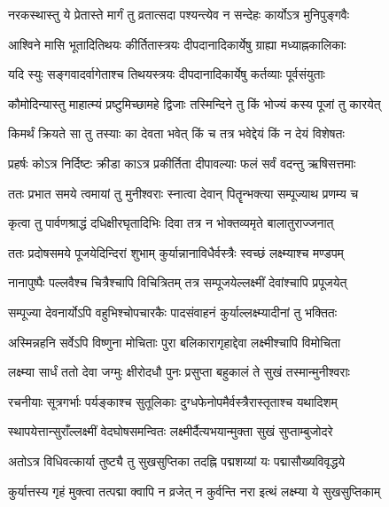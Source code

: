 \twolineshloka
{नरकस्थास्तु ये प्रेतास्ते मार्गं तु व्रतात्सदा}
{पश्यन्त्येव न सन्देहः कार्योऽत्र मुनिपुङ्गवैः} %

\twolineshloka
{आश्विने मासि भूतादितिथयः कीर्तितास्त्रयः}
{दीपदानादिकार्येषु ग्राह्या मध्याह्नकालिकाः} %

\twolineshloka
{यदि स्युः सङ्गवादर्वागेताश्च तिथयस्त्रयः}
{दीपदानादिकार्येषु कर्तव्याः पूर्वसंयुताः} %


\twolineshloka
{कौमोदिन्यास्तु माहात्म्यं प्रष्टुमिच्छामहे द्विजाः}
{तस्मिन्दिने तु किं भोज्यं कस्य पूजां तु कारयेत्} %

\twolineshloka
{किमर्थं क्रियते सा तु तस्याः का देवता भवेत्}
{किं च तत्र भवेद्देयं किं न देयं विशेषतः} %

\twolineshloka
{प्रहर्षः कोऽत्र निर्दिष्टः क्रीडा काऽत्र प्रकीर्तिता}
{दीपावल्याः फलं सर्वं वदन्तु ऋषिसत्तमाः} %


\twolineshloka
{ततः प्रभात समये त्वमायां तु मुनीश्वराः}
{स्नात्वा देवान् पितॄन्भक्त्या सम्पूज्याथ प्रणम्य च} %

\twolineshloka
{कृत्वा तु पार्वणश्राद्धं दधिक्षीरघृतादिभिः}
{दिवा तत्र न भोक्तव्यमृते बालातुराज्जनात्} %

\twolineshloka
{ततः प्रदोषसमये पूजयेदिन्दिरां शुभाम्}
{कुर्यान्नानाविधैर्वस्त्रैः स्वच्छं लक्ष्म्याश्च मण्डपम्} %

\twolineshloka
{नानापुष्पैः पल्लवैश्च चित्रैश्चापि विचित्रितम्}
{तत्र सम्पूजयेल्लक्ष्मीं देवांश्चापि प्रपूजयेत्} %

\twolineshloka
{सम्पूज्या देवनार्योऽपि वहुभिश्चोपचारकैः}
{पादसंवाहनं कुर्याल्लक्ष्म्यादीनां तु भक्तितः} %

\twolineshloka
{अस्मिन्नहनि सर्वेऽपि विष्णुना मोचिताः पुरा}
{बलिकारागृहाद्देवा लक्ष्मीश्चापि विमोचिता} %

\twolineshloka
{लक्ष्म्या सार्धं ततो देवा जग्मुः क्षीरोदधौ पुनः}
{प्रसुप्ता बहुकालं ते सुखं तस्मान्मुनीश्वराः} %

\twolineshloka
{रचनीयाः सूत्रगर्भाः पर्यङ्काश्च सुतूलिकाः}
{दुग्धफेनोपमैर्वस्त्रैरास्तृताश्च यथादिशम्} %

\twolineshloka
{स्थापयेत्तान्सुराँल्लक्ष्मीं वेदघोषसमन्वितः}
{लक्ष्मीर्दैत्यभयान्मुक्ता सुखं सुप्ताम्बुजोदरे} %

\twolineshloka
{अतोऽत्र विधिवत्कार्या तुष्ट्यै तु सुखसुप्तिका}
{तदह्नि पद्मशय्यां यः पद्मासौख्यविवृद्धये} %

\twolineshloka
{कुर्यात्तस्य गृहं मुक्त्वा तत्पद्मा क्वापि न व्रजेत्}
{न कुर्वन्ति नरा इत्थं लक्ष्म्या ये सुखसुप्तिकाम्} %

